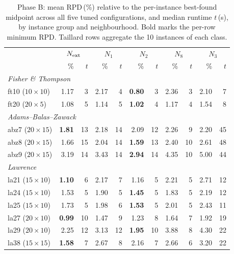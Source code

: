 \documentclass[preprint,12pt]{elsarticle}
\begin{document}
\begin{table}[t]
\centering
\small
\setlength{\tabcolsep}{3pt}
\caption{Phase B: mean RPD\,(\%) relative to the per-instance best-found midpoint across all five tuned configurations, and median runtime $t$\,(s), by instance group and neighbourhood. Bold marks the per-row minimum RPD. Taillard rows aggregate the 10 instances of each class.}
\label{tab:phaseB_groups}
\begin{tabular}{l rr rr rr rr rr}
\hline
 & \multicolumn{2}{c}{$N_{\rm ext}$} & \multicolumn{2}{c}{$N_1$} & \multicolumn{2}{c}{$N_2$} & \multicolumn{2}{c}{$N_8$} & \multicolumn{2}{c}{$N_3$} \\
 & \% & $t$ & \% & $t$ & \% & $t$ & \% & $t$ & \% & $t$ \\
\hline
\multicolumn{11}{l}{\textit{Fisher \& Thompson}} \\
ft10 ($10{\times}10$)  &  1.17 &   3 &  2.17 &   4 & \textbf{0.80} &   3 &  2.36 &   3 &  2.10 &   7 \\
ft20 ($20{\times}5$)   &  1.08 &   5 &  1.14 &   5 & \textbf{1.02} &   4 &  1.17 &   4 &  1.54 &   8 \\
\multicolumn{11}{l}{\textit{Adams--Balas--Zawack}} \\
abz7 ($20{\times}15$)  & \textbf{1.81} &  13 &  2.18 &  14 &  2.09 &  12 &  2.26 &   9 &  2.20 &  45 \\
abz8 ($20{\times}15$)  &  1.66 &  15 &  2.04 &  14 & \textbf{1.59} &  13 &  2.40 &  10 &  2.61 &  48 \\
abz9 ($20{\times}15$)  &  3.19 &  14 &  3.43 &  14 & \textbf{2.94} &  14 &  4.35 &  10 &  5.00 &  44 \\
\multicolumn{11}{l}{\textit{Lawrence}} \\
la21 ($15{\times}10$)  & \textbf{1.10} &   6 &  2.17 &   7 &  1.16 &   5 &  2.21 &   5 &  2.71 &  12 \\
la24 ($15{\times}10$)  &  1.53 &   5 &  1.90 &   5 & \textbf{1.45} &   5 &  1.83 &   5 &  2.19 &  12 \\
la25 ($15{\times}10$)  &  1.73 &   5 &  1.98 &   6 & \textbf{1.53} &   5 &  2.01 &   5 &  2.43 &  11 \\
la27 ($20{\times}10$)  & \textbf{0.99} &  10 &  1.47 &   9 &  1.23 &   8 &  1.64 &   7 &  1.92 &  19 \\
la29 ($20{\times}10$)  &  2.25 &  12 &  3.13 &  12 & \textbf{1.95} &  10 &  3.88 &   8 &  4.30 &  22 \\
la38 ($15{\times}15$)  & \textbf{1.58} &   7 &  2.67 &   8 &  2.16 &   7 &  2.66 &   6 &  3.20 &  22 \\

\end{tabular}
\end{table}
\end{document}
